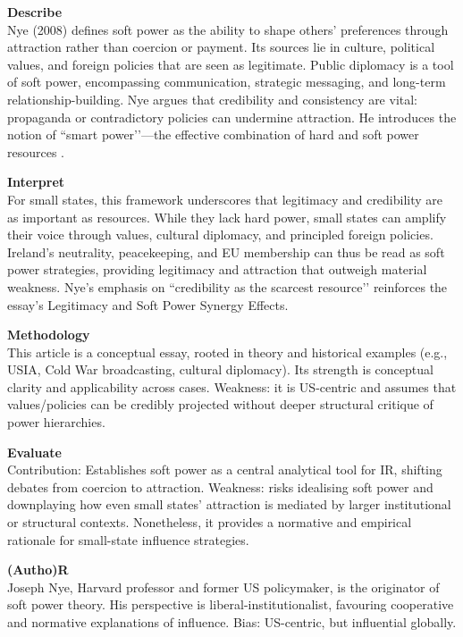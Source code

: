 \textbf{Describe} \\
Nye (2008) defines soft power as the ability to shape others’ preferences through attraction rather than coercion or payment. Its sources lie in culture, political values, and foreign policies that are seen as legitimate. Public diplomacy is a tool of soft power, encompassing communication, strategic messaging, and long-term relationship-building. Nye argues that credibility and consistency are vital: propaganda or contradictory policies can undermine attraction. He introduces the notion of ``smart power’’—the effective combination of hard and soft power resources \parencite{NYE_2008}.

\textbf{Interpret} \\
For small states, this framework underscores that legitimacy and credibility are as important as resources. While they lack hard power, small states can amplify their voice through values, cultural diplomacy, and principled foreign policies. Ireland’s neutrality, peacekeeping, and EU membership can thus be read as soft power strategies, providing legitimacy and attraction that outweigh material weakness. Nye’s emphasis on ``credibility as the scarcest resource’’ reinforces the essay’s Legitimacy and Soft Power Synergy Effects.

\textbf{Methodology} \\
This article is a conceptual essay, rooted in theory and historical examples (e.g., USIA, Cold War broadcasting, cultural diplomacy). Its strength is conceptual clarity and applicability across cases. Weakness: it is US-centric and assumes that values/policies can be credibly projected without deeper structural critique of power hierarchies.

\textbf{Evaluate} \\
Contribution: Establishes soft power as a central analytical tool for IR, shifting debates from coercion to attraction. Weakness: risks idealising soft power and downplaying how even small states’ attraction is mediated by larger institutional or structural contexts. Nonetheless, it provides a normative and empirical rationale for small-state influence strategies.

\textbf{(Autho)R} \\
Joseph Nye, Harvard professor and former US policymaker, is the originator of soft power theory. His perspective is liberal-institutionalist, favouring cooperative and normative explanations of influence. Bias: US-centric, but influential globally.

